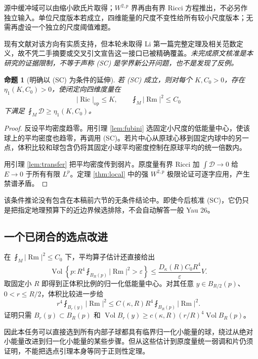 \documentclass[UTF8,fontset=fandol,zihao=-4]{ctexart}
\theoremstyle{cn}
\newtheorem{proposition}[theorem]{命题}
\DeclareMathOperator{\Ric}{Ric}
\DeclareMathOperator{\Rm}{Rm}
\DeclareMathOperator{\Vol}{Vol}
\newcommand{\op}{\mathrm{op}}
\newcommand{\av}{\fint}
\newcommand{\Dcal}{\mathcal D}
\numberwithin{equation}{section}
\begin{document}
源中缓冲域可以由缩小欧氏片取得；$W^{2,p}$ 界再由有界 Ricci 方程推出，不必另作独立输入。单位尺度版本若成立，四维能量的尺度不变性给所有较小尺度版本；无需再虚设一个独立的尺度阈值难题。

现有文献对该方向有实质支持\cite{li,lott,liu}，但本轮未取得 Li 第一篇完整定理及相关范数定义，故不凭二手摘要或交叉引文宣告这一接口已被精确覆盖。\emph{未完成原文核准是本研究的证据限制，不等于声称 (SC) 是学界新公开问题，也不是发现了反例。}

\begin{proposition}[明确以 (SC) 为条件的延伸]\label{prop:conditional}
若 (SC) 成立，则对每个 $K,C_0>0$，存在 $\eta_1(K,C_0)>0$，使闭定向四维度量在
\[
|\Ric|_{\op}\le K,\qquad\av_M|\Rm|^2\le C_0
\]
下满足 $\av_M\Dcal\ge\eta_1(K,C_0)$。
\end{proposition}
\begin{proof}
反设平均密度趋零。用引理 \ref{lem:fubini} 选固定小尺度的低能量中心，使该球上的平均密度也趋零，再调用 (SC)。若片中心从原球心移到固定内球中的另一点，体积比较和球包含仍将其固定小球平均密度控制在原球平均的统一倍数内。

用引理 \ref{lem:transfer} 把平均密度传到弱片。原度量有界 Ricci 加 $\int\Dcal\to0$ 给 $E\to0$ 于所有有限 $L^p$。定理 \ref{thm:local} 中的强 $W^{2,p}$ 极限论证可逐字应用，产生禁谱矛盾。
\end{proof}

该条件推论没有包含在本稿前六节的无条件结论中。即使今后核准 (SC)，它仍只是把指定地理预算下的近边界候选排除，不会自动解答一般 Yau 26。

\subsection{一个已闭合的选点改进}

在 $\av_M|\Rm|^2\le C_0$ 下，平均算子估计还直接给出
\begin{equation}\label{eq:normalized-choice}
\Vol\left\{p:R^4\av_{B_R(p)}|\Rm|^2>\varepsilon\right\}
\le\frac{D_\kappa(R)C_0R^4}{\varepsilon}V.
\end{equation}
取固定小 $R$ 即得到正体积比例的归一化低能量中心。对其任意 $y\in B_{R/2}(p)$、$0<r\le R/2$，体积比较进一步给
\begin{equation}\label{eq:subball}
r^4\av_{B_r(y)}|\Rm|^2
\le C(\kappa,R)R^4\av_{B_R(p)}|\Rm|^2.
\end{equation}
证明只需 $B_r(y)\subset B_R(p)$ 和
$\Vol B_r(y)\ge c(\kappa,R)(r/R)^4\Vol B_R(p)$。

因此本任务可以直接选到所有内部子球都具有临界归一化小能量的球，绕过从绝对小能量改进到归一化小能量的某些步骤。但从这些估计到原度量统一弱调和片仍须证明，不能把选点引理本身等同于正则性定理。
\end{document}
